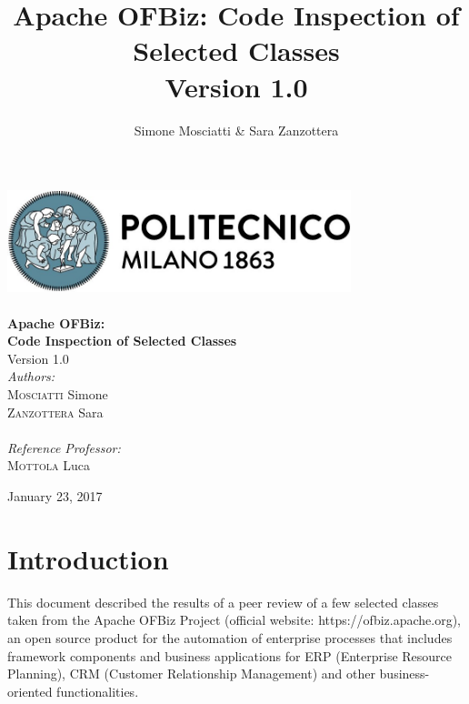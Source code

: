 \documentclass[11pt]{article} %
\title{Apache OFBiz: Code Inspection of Selected Classes \\ {\Large Version 1.0}}
\author{Simone Mosciatti \& Sara Zanzottera}
\begin{document}
\begin{titlepage}

\newcommand{\HRule}{\rule{\linewidth}{0.5mm}} %
\center %

\includegraphics[width=10cm]{../DOC/polimiLogoNome.png}\\[0.5cm] %
 


\\[2cm]
{ \Huge \bfseries Apache OFBiz:} \\[0.5cm] %
{ \LARGE \bfseries Code Inspection of Selected Classes} \\[0.5cm]
{\large Version 1.0}
\\[2cm] 

\Large \emph{Authors:}\\
{\Large \textsc{Mosciatti}} Simone\\ %
{\Large \textsc{Zanzottera}} Sara\\
\\[1cm]
\emph{Reference Professor:} \\
{\Large \textsc{Mottola}} Luca %

\vfill %

{\large January 23, 2017}

\end{titlepage}


\newpage
\tableofcontents
\newpage

\section{Introduction}
This document described the results of a peer review of a few selected classes taken from the Apache OFBiz Project (official website: https://ofbiz.apache.org), an open source product for the automation of enterprise processes that includes framework components and business applications for ERP (Enterprise Resource Planning), CRM (Customer Relationship Management) and other business-oriented functionalities.
 
\end{document}
